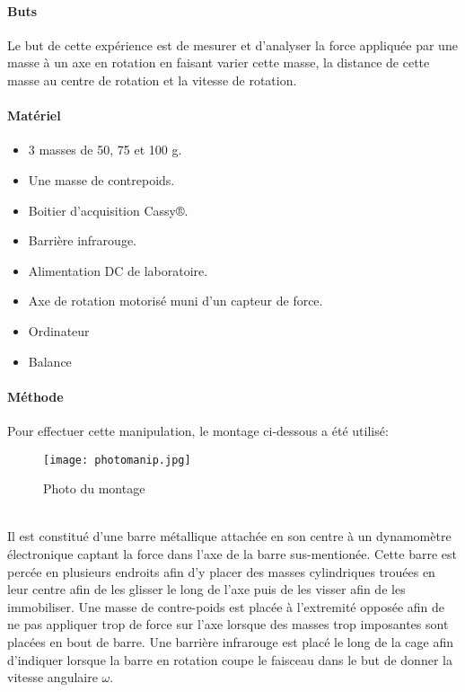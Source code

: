 \paragraph{Buts}
Le but de cette expérience est de mesurer et d'analyser la force appliquée par une masse à un axe en rotation en faisant varier cette masse, la distance de cette masse au centre de rotation et la vitesse de rotation.

\paragraph{Matériel}
\begin{itemize}
    \item 3 masses de 50, 75 et 100 g.
    \item Une masse de contrepoids.
    \item Boitier d'acquisition Cassy®.
    \item Barrière infrarouge.
    \item Alimentation DC de laboratoire.
    \item Axe de rotation motorisé muni d'un capteur de force.
    \item Ordinateur
    \item Balance
\end{itemize}

\paragraph{Méthode}
Pour effectuer cette manipulation, le montage ci-dessous a été utilisé:
\begin{figure}[h]
    \caption[Photo du montage]{Photo du montage}
    \centering
    \texttt{[image: photomanip.jpg]}
\end{figure}
\\
Il est constitué d'une barre métallique attachée en son centre à un dynamomètre électronique captant la force dans l'axe de la barre sus-mentionée.
Cette barre est percée en plusieurs endroits afin d'y placer des masses cylindriques trouées en leur centre afin de les glisser le long de l'axe puis de les visser afin de les immobiliser.
Une masse de contre-poids est placée à l'extremité opposée afin de ne pas appliquer trop de force sur l'axe lorsque des masses trop imposantes sont placées en bout de barre.
Une barrière infrarouge est placé le long de la cage afin d'indiquer lorsque la barre en rotation coupe le faisceau dans le but de donner la vitesse angulaire $\omega$.

